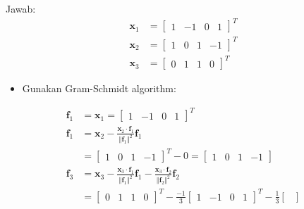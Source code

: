 \documentclass[12pt, a4paper]{scrartcl}
\begin{document}
\begin{enumerate}
\begin{enumerate}
                Jawab:
                \begin{align*}
                    \textbf{x}_1 &= \begin{bmatrix}
                        1&-1&0&1
                    \end{bmatrix}^T
                    \\ \textbf{x}_2 &= \begin{bmatrix}
                        1&0&1&-1
                    \end{bmatrix}^T
                    \\ \textbf{x}_3 &= \begin{bmatrix}
                        0&1&1&0
                    \end{bmatrix}^T
                \end{align*}
                \begin{itemize}
                    \item[] Gunakan Gram-Schmidt algorithm:
                \end{itemize}
                \begin{align*}
                    \textbf{f}_1&=\textbf{x}_1=\begin{bmatrix}
                        1&-1&0&1
                    \end{bmatrix}^T
                    \\\textbf{f}_1&=\textbf{x}_2-\frac{\textbf{x}_2\cdot\textbf{f}_1}{\Vert\textbf{f}_1\Vert^2}\textbf{f}_1
                    \\ &= \begin{bmatrix}
                        1&0&1&-1
                    \end{bmatrix}^T - 0 = \begin{bmatrix}
                        1&0&1&-1
                    \end{bmatrix}
                    \\ \textbf{f}_3 &= \textbf{x}_3-\frac{\textbf{x}_3\cdot\textbf{f}_1}{\Vert\textbf{f}_1\Vert^2}\textbf{f}_1-\frac{\textbf{x}_3\cdot\textbf{f}_2}{\Vert\textbf{f}_2\Vert^2}\textbf{f}_2
                    \\ &= \begin{bmatrix}
                        0&1&1&0
                    \end{bmatrix}^T - \frac{-1}{3}\begin{bmatrix}
                        1&-1&0&1
                    \end{bmatrix}^T - \frac{1}{3}\begin{bmatrix}

\end{bmatrix}
\end{align*}
\end{enumerate}
\end{enumerate}
\end{document}
